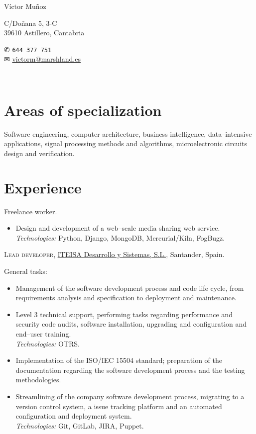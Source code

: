 \documentclass[11pt]{article}
\newcommand{\years}[1]{\marginnote{\scriptsize #1}}
\begin{document}
\begin{minipage}[m]{.3\textwidth}
	{\LARGE Víctor Muñoz}
\end{minipage}
\begin{minipage}[m]{.35\textwidth}
	C/Doñana 5, 3-C\\
	39610 Astillero, Cantabria
\end{minipage}
\begin{minipage}[m]{.3\textwidth}
	{\dingbats ✆} \texttt{644 377 751}\\
	{\dingbats ✉} \href{mailto:victorm@marshland.es}
	                    {victorm@marshland.es}
\end{minipage}\\[.05cm]


\section*{Areas of specialization} %
Software engineering, computer architecture, business intelligence, data--intensive applications, signal processing methods and algorithms, microelectronic circuits design and verification.


\section*{Experience}  %
\noindent
\years{2012--present}Freelance worker.
\begin{itemize}
	\item  Design and development of a web--scale media sharing web service.\\
	\textit{Technologies:} Python, Django, MongoDB, Mercurial/Kiln, FogBugz.
\end{itemize}

\years{2011--2013}\textsc{Lead developer}, \href{http://www.iteisa.com}{ITEISA Desarrollo y Sistemas, S.L.}, Santander, Spain.

General tasks:
\begin{itemize}
	\item  Management of the software development process and code life cycle, from requirements analysis and specification to deployment and maintenance.
	\item  Level 3 technical support, performing tasks regarding performance and security code audits, software installation, upgrading and configuration and end--user training.\\
	\textit{Technologies:} OTRS.
	\item  Implementation of the ISO/IEC 15504 standard; preparation of the documentation regarding the software development process and the testing methodologies.
	\item  Streamlining of the company software development process, migrating to a version control system, a issue tracking platform and an automated configuration and deployment system.\\
	\textit{Technologies:} Git, GitLab, JIRA, Puppet.
\end{itemize}
\end{document}
